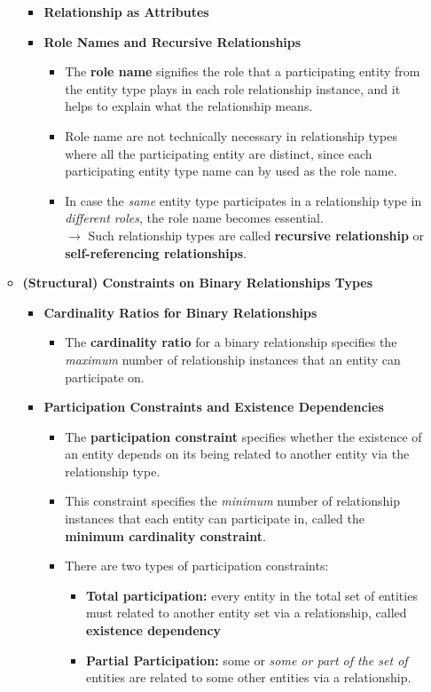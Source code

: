\documentclass[10pt]{article}
\newcommand{\tf}{\textbf}
\newcommand{\ti}{\textit}
\begin{document}
\begin{enumerate}
\begin{itemize}
\begin{itemize}
			\item \tf{Relationship as Attributes}
			\item \tf{Role Names and Recursive Relationships}
			\begin{itemize}
				\item The \tf{role name} signifies the role that a participating entity from the entity type plays in each role relationship instance, and it helps to explain what the relationship means.
				\item Role name are not technically necessary in relationship types where all the participating entity are distinct, since each participating entity type name can by used as the role name.
				\item In case the \ti{same} entity type participates in a relationship type in \ti{different roles}, the role name becomes essential. \\
				$\rightarrow$ Such relationship types are called \tf{recursive relationship} or \tf{self-referencing relationships}. 
			\end{itemize}
		\end{itemize}

		\item \tf{(Structural) Constraints on Binary Relationships Types}
		\begin{itemize}
			\item \tf{Cardinality Ratios for Binary Relationships}
			\begin{itemize}
				\item The \tf{cardinality ratio} for a binary relationship specifies the \ti{maximum} number of relationship instances that an entity can participate on.
			\end{itemize}

			\item \tf{Participation Constraints and Existence Dependencies}
			\begin{itemize}
				\item The \tf{participation constraint} specifies whether the existence of an entity depends on its being related to another entity via the relationship type.
				\item This constraint specifies the \ti{minimum} number of relationship instances that each entity can participate in, called the \tf{minimum cardinality constraint}.
				\item There are two types of participation constraints:
				\begin{itemize}
					\item \tf{Total participation: } every entity in the total set of entities must related to another entity set via a relationship, called \tf{existence dependency}
					\item \tf{Partial Participation: } some or \ti{some or part of the set of} entities are related to some other entities via a relationship. 
				\end{itemize}
			\end{itemize}
		\end{itemize}


\end{itemize}
\end{enumerate}
\end{document}
